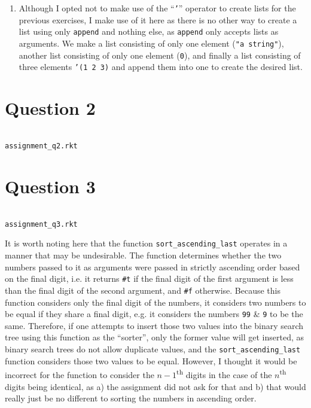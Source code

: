 \documentclass[a4paper]{article}
\newenvironment{code}{\captionsetup{type=listing}}{}
\begin{document}
\begin{enumerate}
    \item   Although I opted not to make use of the ``\texttt{'}'' operator to create lists for the previous exercises, I make use of it here as there is 
            no other way to create a list using only \texttt{append} and nothing else, as \texttt{append} only accepts lists as arguments. 
            We make a list consisting of only one element (\texttt{"a string"}), another list consisting of only one element (\texttt{0}), 
            and finally a list consisting of three elements \texttt{'(1 2 3)} and append them into one to create the desired list.
\end{enumerate}

\section{Question 2}
\begin{code}
    \inputminted[breaklines, frame=single]{racket}{../code/assignment_q2.rkt}
    \caption{\texttt{assignment\_q2.rkt}}
\end{code}

\section{Question 3}
\begin{code}
    \inputminted[breaklines, frame=single]{racket}{../code/assignment_q3.rkt}
    \caption{\texttt{assignment\_q3.rkt}}
\end{code}

It is worth noting here that the function \texttt{sort_ascending_last} operates in a manner that may be undesirable. 
The function determines whether the two numbers passed to it as arguments were passed in strictly ascending order based on the final 
digit, i.e. it returns \texttt{#t} if the final digit of the first argument is less than the final digit of the second 
argument, and \texttt{#f} otherwise.
Because this function considers only the final digit of the numbers, it considers two numbers to be equal if they share a final digit, 
e.g. it considers the numbers \texttt{99} \& \texttt{9} to be the same.
Therefore, if one attempts to insert those two values into the binary search tree using this function as the ``sorter'', only the 
former value will get inserted, as binary search trees do not allow duplicate values, and the \texttt{sort_ascending_last} function
considers those two values to be equal.
However, I thought it would be incorrect for the function to consider the $n-1$\textsuperscript{th} digits in the case of the $n$\textsuperscript{th} digits being identical, as
a) the assignment did not ask for that and b) that would really just be no different to sorting the numbers in ascending order.
\end{document}
